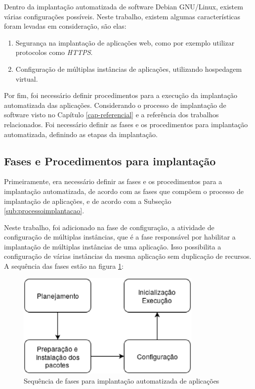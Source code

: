 Dentro da implantação automatizada de software Debian GNU/Linux, existem várias
configurações possíveis. Neste trabalho, existem algumas características foram 
levadas em consideração, são elas:

\begin{enumerate}
  \item  Segurança na implantação de aplicações web,
   como por exemplo utilizar protocolos como \textit{HTTPS}.
  \item  Configuração de múltiplas instâncias de
   aplicações, utilizando hospedagem virtual.
\end{enumerate}

Por fim, foi necessário definir procedimentos para a execução da implantação 
automatizada das aplicações. Considerando
o processo de implantação de software visto no Capítulo \ref{cap-referencial}
e a referência dos trabalhos relacionados. Foi necessário definir as fases e os
procedimentos para implantação automatizada, definindo as etapas
da implantação.

\subsection{Fases e Procedimentos para implantação}
\label{sec:fases}

Primeiramente, era necessário definir as fases e os procedimentos para a implantação 
automatizada, de acordo com as fases que compõem o processo de 
implantação de aplicações, e de acordo com a Subseção \ref{sub:processoimplantacao}. 

Neste trabalho, foi adicionado na fase de configuração, a atividade de configuração de múltiplas
instâncias, que é a fase responsável por habilitar a implantação de múltiplas 
instâncias de uma aplicação. Isso possibilita a configuração de várias instâncias da mesma aplicação sem duplicação de recursos. A sequência
das fases estão na figura \ref{fig:1}:

\begin{figure}[h]
  \centering
  \includegraphics[width=0.8\textwidth]
      {figuras/fases}
      \caption{Sequência de fases para implantação automatizada de aplicações}
  \label{fig:1}
\end{figure}

